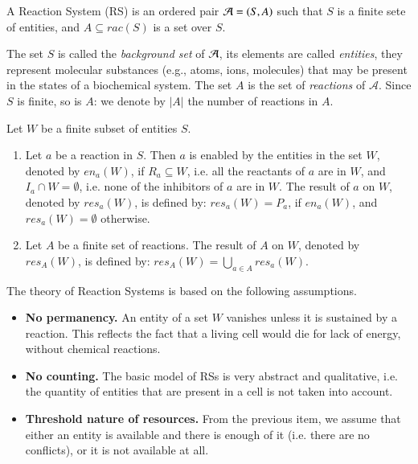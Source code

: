 \begin{definition}
A Reaction System (RS) is an ordered pair ${\cal A} = (S, A)$ 
such that $S$ is a finite sete {\color{red} of  entities, and $A \subseteq rac(S)$ is a set over $S$}.
\end{definition}

The set $S$ is called the \emph{background set} of ${\cal A}$, its elements are called \emph{entities},
they represent molecular substances (e.g., atoms, ions, molecules) that may be present
in the states of a biochemical system.
The set $A$ is the set of \emph{reactions} of $\mathcal{A}$.
Since $S$ is finite, so is $A$: 
we denote by $|A|$ the number of reactions in $A$.

\begin{definition}
Let $W$ be a finite subset of  entities $S$.
\begin{enumerate}
\item Let $a$ be a reaction in $S$. Then $a$ is enabled by the entities in the set $W$, denoted by $\mathit{en}_a(W)$, 
if $R_a \subseteq W$, i.e. all the reactants of $a$ are in $W$,
and $I_a \cap W = \emptyset$, i.e. none of the inhibitors of $a$ are in $W$. The result of $a$ on $W$, denoted by $\mathit{res}_a(W)$, 
is defined by:
$\mathit{res}_a(W) =P_a$, if $\mathit{en}_a(W)$, and $\mathit{res}_a(W) = \emptyset$ otherwise.
\item Let $A$ be a finite set of reactions. The result of $A$ on $W$, denoted 
by $\mathit{res}_A(W)$,  is defined
by: $\mathit{res}_A(W) = \bigcup_{a \in A} \mathit{res}_a(W)$.
\end{enumerate}
\end{definition}


The theory of Reaction Systems is based on the following assumptions.
\begin{itemize}
\item {\bf No permanency.} An entity of a set $W$ vanishes unless it is sustained 
by a reaction. This reflects the fact that a living cell would die for lack 
of energy, without chemical reactions.
\item {\bf No counting.} The basic model of RSs is very abstract and 
qualitative, i.e. the quantity of entities that are present 
in a cell is not taken into account. 
\item {\bf Threshold nature of resources.} From the 
previous item,
we assume that either an entity is available and there is enough of it 
(i.e. there are no conflicts), or it is not available at all.
\end{itemize}




